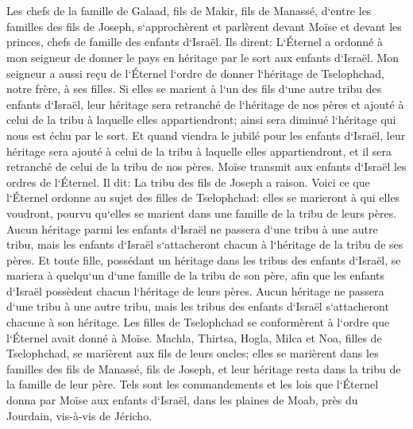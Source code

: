 \chapter{}

\verse Les chefs de la famille de Galaad, fils de Makir, fils de Manassé, d`entre les familles des fils de Joseph, s`approchèrent et parlèrent devant Moïse et devant les princes, chefs de famille des enfants d`Israël. 
\verse Ils dirent: L`Éternel a ordonné à mon seigneur de donner le pays en héritage par le sort aux enfants d`Israël. Mon seigneur a aussi reçu de l`Éternel l`ordre de donner l`héritage de Tselophchad, notre frère, à ses filles. 
\verse Si elles se marient à l`un des fils d`une autre tribu des enfants d`Israël, leur héritage sera retranché de l`héritage de nos pères et ajouté à celui de la tribu à laquelle elles appartiendront; ainsi sera diminué l`héritage qui nous est échu par le sort. 
\verse Et quand viendra le jubilé pour les enfants d`Israël, leur héritage sera ajouté à celui de la tribu à laquelle elles appartiendront, et il sera retranché de celui de la tribu de nos pères. 
\verse Moïse transmit aux enfants d`Israël les ordres de l`Éternel. Il dit: La tribu des fils de Joseph a raison. 
\verse Voici ce que l`Éternel ordonne au sujet des filles de Tselophchad: elles se marieront à qui elles voudront, pourvu qu`elles se marient dans une famille de la tribu de leurs pères. 
\verse Aucun héritage parmi les enfants d`Israël ne passera d`une tribu à une autre tribu, mais les enfants d`Israël s`attacheront chacun à l`héritage de la tribu de ses pères. 
\verse Et toute fille, possédant un héritage dans les tribus des enfants d`Israël, se mariera à quelqu`un d`une famille de la tribu de son père, afin que les enfants d`Israël possèdent chacun l`héritage de leurs pères. 
\verse Aucun héritage ne passera d`une tribu à une autre tribu, mais les tribus des enfants d`Israël s`attacheront chacune à son héritage. 
\verse Les filles de Tselophchad se conformèrent à l`ordre que l`Éternel avait donné à Moïse. 
\verse Machla, Thirtsa, Hogla, Milca et Noa, filles de Tselophchad, se marièrent aux fils de leurs oncles; 
\verse elles se marièrent dans les familles des fils de Manassé, fils de Joseph, et leur héritage resta dans la tribu de la famille de leur père. 
\verse Tels sont les commandements et les lois que l`Éternel donna par Moïse aux enfants d`Israël, dans les plaines de Moab, près du Jourdain, vis-à-vis de Jéricho. 
